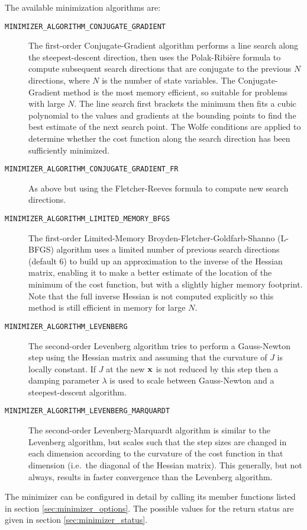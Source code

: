 \documentclass[a4,oneside]{book}
\def\codesize{\small}
\def\citem#1{\item[{\codesize\texttt{#1}}]}
\begin{document}
The available minimization algorithms are:
\begin{description}
\citem{MINIMIZER\_ALGORITHM\_CONJUGATE\_GRADIENT} The first-order
Conjugate-Gradient algorithm performs a line search along the
steepest-descent direction, then uses the Polak-Ribi\`ere formula to
compute subsequent search directions that are conjugate to the
previous $N$ directions, where $N$ is the number of state
variables. The Conjugate-Gradient method is the most memory efficient,
so suitable for problems with large $N$. The line search first
brackets the minimum then fits a cubic polynomial to the values and
gradients at the bounding points to find the best estimate of the next
search point. The Wolfe conditions are applied to determine whether
the cost function along the search direction has been sufficiently
minimized.
%
\citem{MINIMIZER\_ALGORITHM\_CONJUGATE\_GRADIENT\_FR} As above but
using the Fletcher-Reeves formula to compute new search directions.
%
\citem{MINIMIZER\_ALGORITHM\_LIMITED\_MEMORY\_BFGS} The first-order
Limited-Memory Broyden-Fletcher-Goldfarb-Shanno (L-BFGS) algorithm
uses a limited number of previous search directions (default 6) to
build up an approximation to the inverse of the Hessian matrix,
enabling it to make a better estimate of the location of the minimum
of the cost function, but with a slightly higher memory
footprint. Note that the full inverse Hessian is not computed
explicitly so this method is still efficient in memory for large $N$.
%
\citem{MINIMIZER\_ALGORITHM\_LEVENBERG} The second-order Levenberg
algorithm tries to perform a Gauss-Newton step using the Hessian
matrix and assuming that the curvature of $J$ is locally constant. If
$J$ at the new ${\bf x}$ is not reduced by this step then a damping
parameter $\lambda$ is used to scale between Gauss-Newton and a
steepest-descent algorithm.
%
\citem{MINIMIZER\_ALGORITHM\_LEVENBERG\_MARQUARDT} The second-order
Levenberg-Marquardt algorithm is similar to the Levenberg algorithm,
but scales such that the step sizes are changed in each dimension
according to the curvature of the cost function in that dimension
(i.e.\ the diagonal of the Hessian matrix). This generally, but not
always, results in faster convergence than the Levenberg algorithm.
\end{description}
The minimizer can be configured in detail by calling its member
functions listed in section \ref{sec:minimizer_options}.  The possible
values for the return status are given in section
\ref{sec:minimizer_status}.
\end{document}
